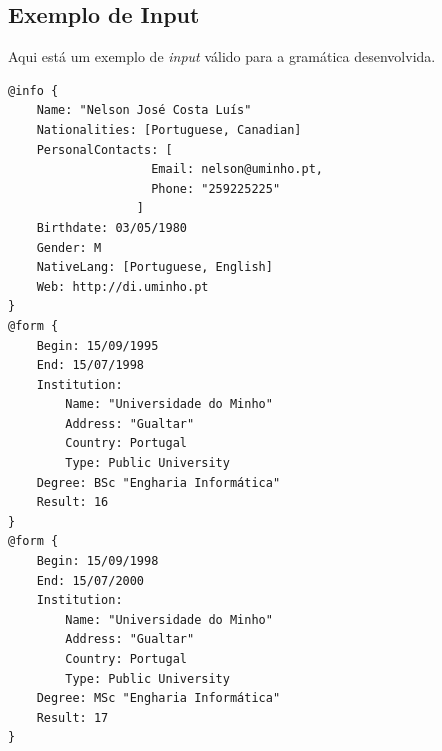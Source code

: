 \documentclass[a4paper,11pt,openright,openbib]{article}
\begin{document}
\subsection{Exemplo de Input}
Aqui está um exemplo de \emph{input} válido para a gramática desenvolvida.
\begin{verbatim}
@info {
	Name: "Nelson José Costa Luís"
	Nationalities: [Portuguese, Canadian]
	PersonalContacts: [
					Email: nelson@uminho.pt,
					Phone: "259225225"
				  ]
	Birthdate: 03/05/1980
	Gender: M
	NativeLang: [Portuguese, English]
	Web: http://di.uminho.pt
}
@form {
	Begin: 15/09/1995
	End: 15/07/1998
	Institution:
		Name: "Universidade do Minho"
		Address: "Gualtar"
		Country: Portugal
		Type: Public University
	Degree: BSc "Engharia Informática"
	Result: 16
}
@form {
	Begin: 15/09/1998
	End: 15/07/2000
	Institution: 
		Name: "Universidade do Minho"
		Address: "Gualtar"
		Country: Portugal
		Type: Public University
	Degree: MSc "Engharia Informática"
	Result: 17
}
\end{verbatim}
\end{document}
